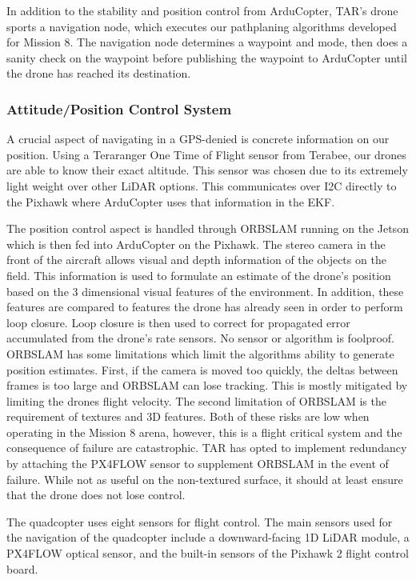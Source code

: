 \documentclass[12pt,letterpaper]{article}
\begin{document}
			In addition to the stability and position control from ArduCopter, TAR’s drone sports a navigation node, which executes our pathplaning algorithms developed for Mission 8. The navigation node determines a waypoint and mode, then does a sanity check on the waypoint before publishing the waypoint to ArduCopter until the drone has reached its destination.

		\subsubsection*{Attitude/Position Control System}

			A crucial aspect of navigating in a GPS-denied is concrete information on our position. Using a Teraranger One Time of Flight sensor from Terabee, our drones are able to know their exact altitude. This sensor was chosen due to its extremely light weight over other LiDAR options. This communicates over I2C directly to the Pixhawk where ArduCopter uses that information in the EKF.

			The position control aspect is handled through ORBSLAM running on the Jetson which is then fed into ArduCopter on the Pixhawk. The stereo camera in the front of the aircraft allows visual and depth information of the objects on the field. This information is used to formulate an estimate of the drone’s position based on the 3 dimensional visual features of the environment. In addition, these features are compared to features the drone has already seen in order to perform loop closure. Loop closure is then used to correct for propagated error accumulated from the drone’s rate sensors. No sensor or algorithm is foolproof. ORBSLAM has some limitations which limit the algorithms ability to generate position estimates. First, if the camera is moved too quickly, the deltas between frames is too large and ORBSLAM can lose tracking. This is mostly mitigated by limiting the drones flight velocity. The second limitation of ORBSLAM is the requirement of textures and 3D features. Both of these risks are low when operating in the Mission 8 arena, however, this is a flight critical system and the consequence of failure are catastrophic. TAR has opted to implement redundancy by attaching the PX4FLOW sensor to supplement ORBSLAM in the event of failure. While not as useful on the non-textured surface, it should at least ensure that the drone does not lose control.

			The quadcopter uses eight sensors for flight control. The main sensors used for the navigation of the quadcopter include a downward-facing 1D LiDAR module, a PX4FLOW optical sensor, and the built-in sensors of the Pixhawk 2 flight control board.
\end{document}
